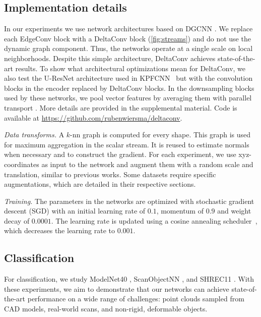 \documentclass[acmtog, authorversion]{acmart}
\begin{document}
\subsection{Implementation details}
In our experiments we use network architectures based on DGCNN \cite{Wang2019}. We replace each EdgeConv block with a DeltaConv block (\autoref{fig:streams}) and do not use the dynamic graph component. Thus, the networks operate at a single scale on local neighborhoods. Despite this simple architecture, DeltaConv achieves state-of-the-art results. To show what architectural optimizations mean for DeltaConv, we also test the U-ResNet architecture used in KPFCNN~\cite{thomas2019KPConv} but with the convolution blocks in the encoder replaced by DeltaConv blocks. In the downsampling blocks used by these networks, we pool vector features by averaging them with parallel transport \cite{Wiersma2020}. More details are provided in the supplemental material. Code is available at \url{https://github.com/rubenwiersma/deltaconv}.

\emph{Data transforms.} A $k$-nn graph is computed for every shape. This graph is used for maximum aggregation in the scalar stream. It is reused to estimate normals when necessary and to construct the gradient. For each experiment, we use xyz-coordinates as input to the network and augment them with a random scale and translation, similar to previous works. Some datasets require specific augmentations, which are detailed in their respective sections.

\emph{Training.} The parameters in the networks are optimized with stochastic gradient descent (SGD) with an initial learning rate of $0.1$, momentum of $0.9$ and weight decay of $0.0001$. The learning rate is updated using a cosine annealing scheduler~\cite{cosineannealing2017}, which decreases the learning rate to $0.001$.

\subsection{Classification}
For classification, we study ModelNet40 \cite{Wu2015}, ScanObjectNN \cite{uy-scanobjectnn-iccv19}, and SHREC11 \cite{lian2011}. With these experiments, we aim to demonstrate that our networks can achieve state-of-the-art performance on a wide range of challenges: point clouds sampled from CAD models, real-world scans, and non-rigid, deformable objects.
\end{document}
